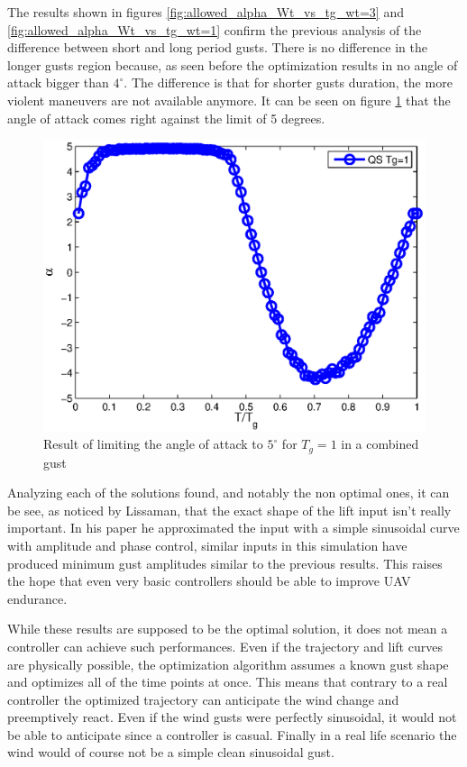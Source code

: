 The results shown in figures \ref{fig:allowed_alpha_Wt_vs_tg_wt=3} and \ref{fig:allowed_alpha_Wt_vs_tg_wt=1} confirm the previous analysis of the difference between short and long period gusts.
There is no difference in the longer gusts region because, as seen before the optimization results in no angle of attack bigger than $4^{\circ}$.
The difference is that for shorter gusts duration, the more violent maneuvers are not available anymore.
It can be seen on figure \ref{fig:alpha_vs_tg_maxalpha=5} that the angle of attack comes right against the limit of 5 degrees.

\begin{figure}[h]
  \centering
  \includegraphics{./Figures/alpha_vs_tg_Tg=1_wt3_maxalpha=5.eps}
  \caption{Result of limiting the angle of attack to $5^{\circ}$ for $T_g=1$ in a combined gust}
  \label{fig:alpha_vs_tg_maxalpha=5}
\end{figure}

\FloatBarrier
{}
Analyzing each of the solutions found, and notably the non optimal ones, it can be see, as noticed by Lissaman, that the exact shape of the lift input isn't really important.
In his paper he approximated the input with a simple sinusoidal curve with amplitude and phase control, similar inputs in this simulation have produced minimum gust amplitudes similar to the previous results.
This raises the hope that even very basic controllers should be able to improve UAV endurance. 

\par While these results are supposed to be the optimal solution, it does not mean a controller can achieve such performances.
Even if the trajectory and lift curves are physically possible, the optimization algorithm assumes a known gust shape and optimizes all of the time points at once.
This means that contrary to a real controller the optimized trajectory can anticipate the wind change and preemptively react.
Even if the wind gusts were perfectly sinusoidal, it would not be able to anticipate since a controller is casual.
Finally in a real life scenario the wind would of course not be a simple clean sinusoidal gust.


